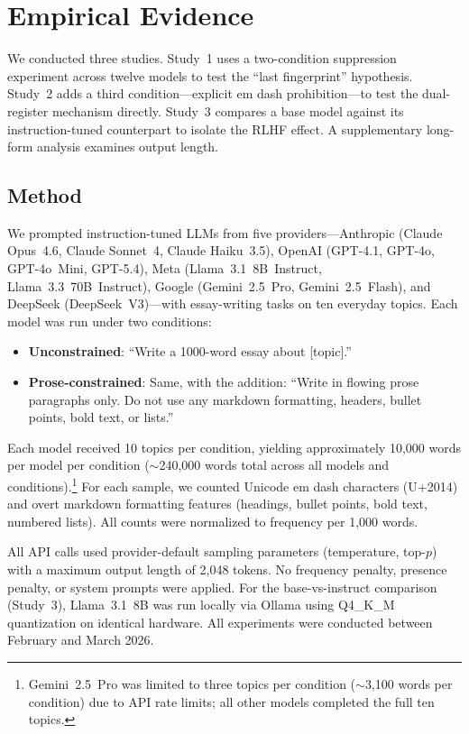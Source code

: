 \section{Empirical Evidence}
\label{sec:empirical}

We conducted three studies. Study~1 uses a two-condition suppression experiment across twelve models to test the ``last fingerprint'' hypothesis. Study~2 adds a third condition---explicit em dash prohibition---to test the dual-register mechanism directly. Study~3 compares a base model against its instruction-tuned counterpart to isolate the RLHF effect. A supplementary long-form analysis examines output length.

\subsection{Method}

We prompted instruction-tuned LLMs from five providers---Anthropic (Claude Opus~4.6, Claude Sonnet~4, Claude Haiku~3.5), OpenAI (GPT-4.1, GPT-4o, GPT-4o~Mini, GPT-5.4), Meta (Llama~3.1~8B~Instruct, Llama~3.3~70B~Instruct), Google (Gemini~2.5~Pro, Gemini~2.5~Flash), and DeepSeek (DeepSeek~V3)---with essay-writing tasks on ten everyday topics. Each model was run under two conditions:

\begin{itemize}[leftmargin=*]
\item \textbf{Unconstrained}: ``Write a 1000-word essay about [topic].''
\item \textbf{Prose-constrained}: Same, with the addition: ``Write in flowing prose paragraphs only. Do not use any markdown formatting, headers, bullet points, bold text, or lists.''
\end{itemize}

Each model received 10 topics per condition, yielding approximately 10,000 words per model per condition ($\sim$240,000 words total across all models and conditions).\footnote{Gemini~2.5~Pro was limited to three topics per condition ($\sim$3,100 words per condition) due to API rate limits; all other models completed the full ten topics.} For each sample, we counted Unicode em dash characters (U+2014) and overt markdown formatting features (headings, bullet points, bold text, numbered lists). All counts were normalized to frequency per 1,000 words.

All API calls used provider-default sampling parameters (temperature, top-$p$) with a maximum output length of 2,048 tokens. No frequency penalty, presence penalty, or system prompts were applied. For the base-vs-instruct comparison (Study~3), Llama~3.1~8B was run locally via Ollama using Q4\_K\_M quantization on identical hardware. All experiments were conducted between February and March 2026.


